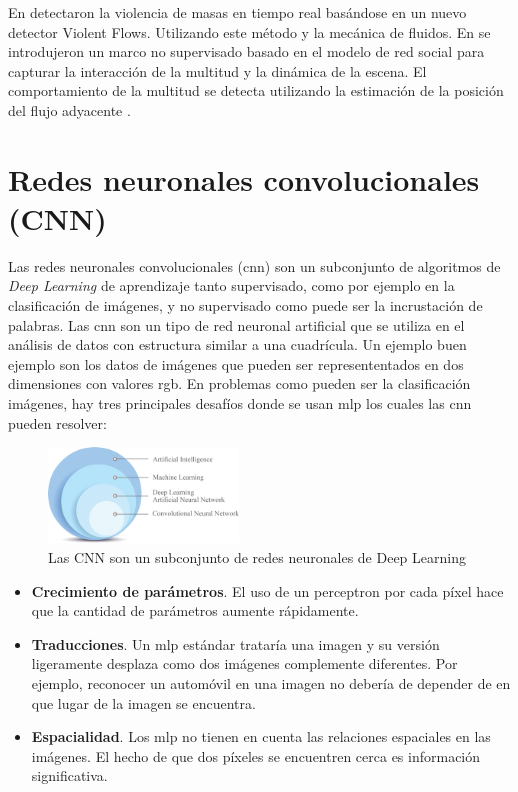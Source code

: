 En \cite{6239348} detectaron la violencia de masas en tiempo real basándose en un nuevo detector Violent Flows. Utilizando este método y la mecánica de fluidos. En \cite{CHAKER2017266} se introdujeron un marco no supervisado basado en el modelo de red social para capturar la interacción de la multitud y la dinámica de la escena. El comportamiento de la multitud se detecta utilizando la estimación de la posición del flujo adyacente \cite{7790305}.

\section{Redes neuronales convolucionales (CNN)}
\label{sec:intro-redes-neuronales-convolucionales}

Las redes neuronales convolucionales (\gls{cnn}) son un subconjunto de algoritmos de \textit{Deep Learning} de aprendizaje tanto supervisado, como por ejemplo en la clasificación de imágenes, y no supervisado como puede ser la incrustación de palabras. Las \gls{cnn} son un tipo de red neuronal artificial que se utiliza en el análisis de datos con estructura similar a una cuadrícula. Un ejemplo buen ejemplo son los datos de imágenes que pueden ser represententados en dos dimensiones con valores \gls{rgb}. En problemas como pueden ser la clasificación imágenes, hay tres principales desafíos donde se usan \gls{mlp} los cuales las \gls{cnn} pueden resolver:

\begin{figure}[ht]
\centering
\includegraphics[width=0.45\textwidth]{img/chapters/estado-del-arte/cnn-radiologic.png}
\caption{\label{fig:cnn-dlnn}Las CNN son un subconjunto de redes neuronales de Deep Learning}
\end{figure}

\begin{itemize}
    \item \textbf{Crecimiento de parámetros}. El uso de un perceptron por cada píxel hace que la cantidad de parámetros aumente rápidamente.
    \item \textbf{Traducciones}. Un \gls{mlp} estándar trataría una imagen y su versión ligeramente desplaza como dos imágenes complemente diferentes. Por ejemplo, reconocer un automóvil en una imagen no debería de depender de en que lugar de la imagen se encuentra.
    \item \textbf{Espacialidad}. Los \gls{mlp} no tienen en cuenta las relaciones espaciales en las imágenes. El hecho de que dos píxeles se encuentren cerca es información significativa.
\end{itemize}

